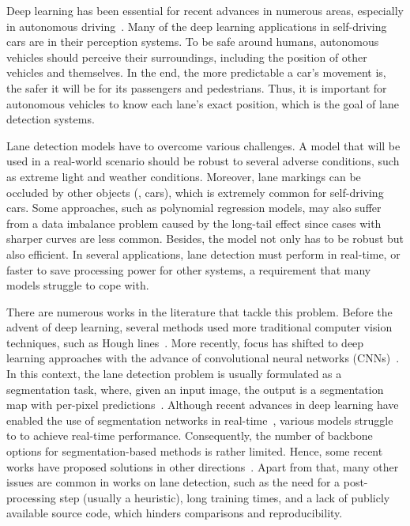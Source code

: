 \documentclass[final]{cvpr}
\begin{document}
Deep learning has been essential for recent advances in numerous areas, especially in autonomous driving~\cite{badue2020self}. Many of the deep learning applications in self-driving cars are in their perception systems. To be safe around humans, autonomous vehicles should perceive their surroundings, including the position of other vehicles and themselves. In the end, the more predictable a car's movement is, the safer it will be for its passengers and pedestrians. Thus, it is important for autonomous vehicles to know each lane's exact position, which is the goal of lane detection systems.



Lane detection models have to overcome various challenges. A model that will be used in a real-world scenario should be robust to several adverse conditions, such as extreme light and weather conditions. Moreover, lane markings can be occluded by other objects (\eg, cars), which is extremely common for self-driving cars.
Some approaches, such as polynomial regression models, may also suffer from a data imbalance problem caused by the long-tail effect since cases with sharper curves are less common.
Besides, the model not only has to be robust but also efficient. In several applications, lane detection must perform in real-time, or faster to save processing power for other systems, a requirement that many models struggle to cope with.



There are numerous works in the literature that tackle this problem. Before the advent of deep learning, several methods used more traditional computer vision techniques, such as Hough lines~\cite{berriel2017ego,assidiq2008real}. More recently, focus has shifted to deep learning approaches with the advance of convolutional neural networks (CNNs)~\cite{scnn,enet-sad,fastdraw}. In this context, the lane detection problem is usually formulated as a segmentation task, where, given an input image, the output is a segmentation map with per-pixel predictions~\cite{scnn}. Although recent advances in deep learning have enabled the use of segmentation networks in real-time~\cite{romera2017erfnet}, various models struggle to to achieve real-time performance. Consequently, the number of backbone options for segmentation-based methods is rather limited. Hence, some recent works have proposed solutions in other directions~\cite{linecnn,polylanenet}. Apart from that, many other issues are common in works on lane detection, such as the need for a post-processing step (usually a heuristic), long training times, and a lack of publicly available source code, which hinders comparisons and reproducibility.
\end{document}
